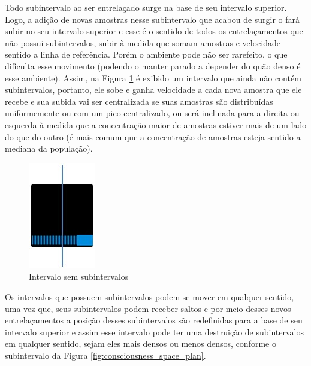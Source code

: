Todo subintervalo ao ser entrelaçado surge na base de seu intervalo superior. Logo, a adição de novas amostras nesse subintervalo que acabou de surgir o fará subir no seu intervalo superior e esse é o sentido de todos os entrelaçamentos que não possui subintervalos, subir à medida que somam amostras e velocidade sentido a linha de referência. Porém o ambiente pode não ser rarefeito, o que dificulta esse movimento (podendo o manter parado a depender do quão denso é esse ambiente). Assim, na Figura \ref{fig:consciousness_space_plan_nosubinterval} é exibido um intervalo que ainda não contém subintervalos, portanto, ele sobe e ganha velocidade a cada nova amostra que ele recebe e sua subida vai ser centralizada se suas amostras são distribuídas uniformemente ou com um pico centralizado, ou será inclinada para a direita ou esquerda à medida que a concentração maior de amostras estiver mais de um lado do que do outro (é mais comum que a concentração de amostras esteja sentido a mediana da população).
	\begin{figure}[H]
	\caption{Intervalo sem subintervalos}
	\label{fig:consciousness_space_plan_nosubinterval}
	\centering
	\includegraphics[scale=.7]{sections/images/consciousness_space_plan_nosubinterval.jpg}
	\end{figure}
	
Os intervalos que possuem subintervalos podem se mover em qualquer sentido, uma vez que, seus subintervalos podem receber saltos e por meio desses novos entrelaçamentos a posição desses subintervalos são redefinidas para a base de seu intervalo superior e assim esse intervalo pode ter uma destruição de subintervalos em qualquer sentido, sejam eles mais densos ou menos densos, conforme o subintervalo da Figura \ref{fig:consciousness_space_plan}.

